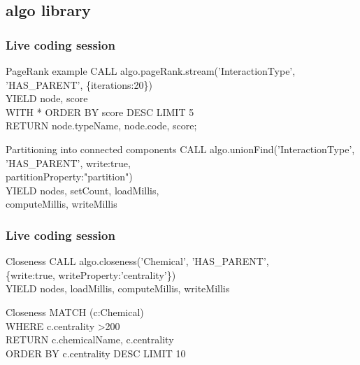 \documentclass[12pt]{beamer}
\begin{document}
    \subsection{algo library}
    \begin{frame}
        \frametitle{Live coding session}
        \begin{block}{PageRank example}
            CALL algo.pageRank.stream('InteractionType',\\
            \hspace{1cm} 'HAS\_PARENT', \{iterations:20\})\\
            \hspace{1cm} YIELD node, score\\
            WITH * ORDER BY score DESC LIMIT 5\\
            RETURN node.typeName, node.code, score;
        \end{block}
        \begin{block}{Partitioning into connected components}
            CALL algo.unionFind('InteractionType',\\
            \hspace{2cm} 'HAS\_PARENT', {write:true,\\
            \hspace{2cm} partitionProperty:"partition"})\\
            YIELD nodes, setCount, loadMillis,\\
            \hspace{2cm} computeMillis, writeMillis
        \end{block}
    \end{frame}
    
    \begin{frame}
        \frametitle{Live coding session}
        \begin{block}{Closeness}
            CALL algo.closeness('Chemical', 'HAS\_PARENT',\\
            \hspace{1cm} \{write:true, writeProperty:'centrality'\})\\
            YIELD nodes, loadMillis, computeMillis, writeMillis
        \end{block}
        
        \begin{block}{Closeness}
            MATCH (c:Chemical)\\
            \hspace{1cm} WHERE c.centrality \textgreater 200\\
            RETURN c.chemicalName, c.centrality\\
            \hspace{1cm} ORDER BY c.centrality DESC LIMIT 10
        \end{block}
    \end{frame}
   
\end{document}
